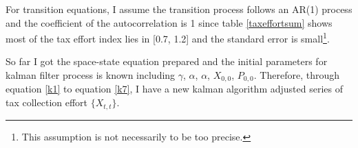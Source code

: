 

For transition equations, I assume the transition process follows an AR(1) process and the coefficient of the autocorrelation is 1 since table \ref{taxeffortsum} shows most of the tax effort index lies in [0.7, 1.2] and the standard error is small\footnote{This assumption is not necessarily to be too precise.}.

So far I got the space-state equation prepared and the initial parameters for kalman filter process is known including $\gamma$, $\alpha$, $\alpha$, $X_{0,0}$, $P_{0,0}$. Therefore, through equation \ref{k1} to equation \ref{k7}, I have a new kalman algorithm adjusted series of tax collection effort $\{X_{t,t}\}$.



